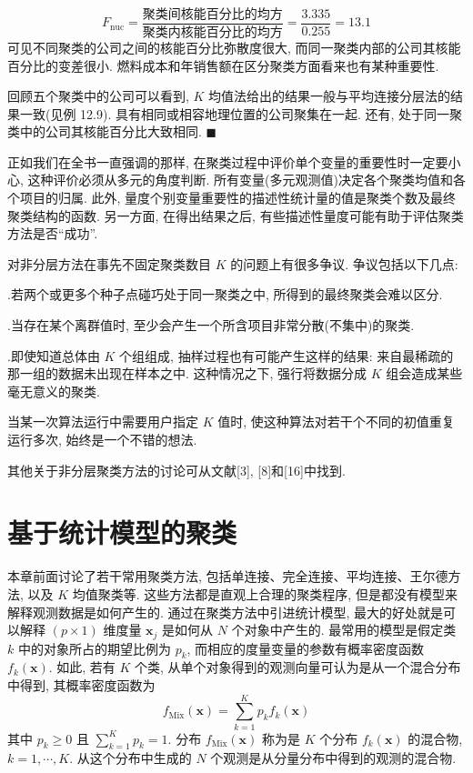
\[
F_{\text{nuc}}=\frac{\text{聚类间核能百分比的均方}}{\text{聚类内核能百分比的均方}}=\frac{3.335}{0.255}=13.1
\]
可见不同聚类的公司之间的核能百分比弥散度很大, 而同一聚类内部的公司其核能百分比的变差很小. 燃料成本和年销售额在区分聚类方面看来也有某种重要性.

回顾五个聚类中的公司可以看到, $K$ 均值法给出的结果一般与平均连接分层法的结果一致(见例 12.9). 具有相同或相容地理位置的公司聚集在一起.
还有, 处于同一聚类中的公司其核能百分比大致相同. \hfill$\blacksquare$

正如我们在全书一直强调的那样, 在聚类过程中评价单个变量的重要性时一定要小心, 这种评价必须从多元的角度判断.
所有变量(多元观测值)决定各个聚类均值和各个项目的归属. 此外, 量度个别变量重要性的描述性统计量的值是聚类个数及最终聚类结构的函数.
另一方面, 在得出结果之后, 有些描述性量度可能有助于评估聚类方法是否“成功”.


对非分层方法在事先不固定聚类数目 $K$ 的问题上有很多争议. 争议包括以下几点:

.\quad 若两个或更多个种子点碰巧处于同一聚类之中, 所得到的最终聚类会难以区分.

.\quad 当存在某个离群值时, 至少会产生一个所含项目非常分散(不集中)的聚类.

.\quad 即使知道总体由 $K$ 个组组成, 抽样过程也有可能产生这样的结果: 来自最稀疏的那一组的数据未出现在样本之中. 这种情况之下, 强行将数据分成 $K$ 组会造成某些毫无意义的聚类.

\noindent 当某一次算法运行中需要用户指定 $K$ 值时, 使这种算法对若干个不同的初值重复运行多次, 始终是一个不错的想法.

其他关于非分层聚类方法的讨论可从文献[3], [8]和[16]中找到.

\section{基于统计模型的聚类}
\label{sec:12.5}

本章前面讨论了若干常用聚类方法, 包括单连接、完全连接、平均连接、王尔德方法, 以及 $K$ 均值聚类等.
这些方法都是直观上合理的聚类程序, 但是都没有模型来解释观测数据是如何产生的.
通过在聚类方法中引进统计模型, 最大的好处就是可以解释 $(p\times 1)$ 维度量 $\mathbf{x}_j$ 是如何从 $N$ 个对象中产生的.
最常用的模型是假定类 $k$ 中的对象所占的期望比例为 $p_k$, 而相应的度量变量的参数有概率密度函数 $f_k(\mathbf{x})$.
如此, 若有 $K$ 个类, 从单个对象得到的观测向量可认为是从一个混合分布中得到, 其概率密度函数为
\[
f_{\text{Mix}}(\mathbf{x})=\sum_{k=1}^{K}p_k f_k(\mathbf{x})
\]
其中 $p_k\ge 0$ 且 $\sum\limits_{k=1}^{K}p_k=1$. 分布 $f_{\text{Mix}}(\mathbf{x})$ 称为是 $K$ 个分布 $f_k(\mathbf{x})$ 的混合物, $k=1,\cdots,K$.
从这个分布中生成的 $N$ 个观测是从分量分布中得到的观测的混合物.

